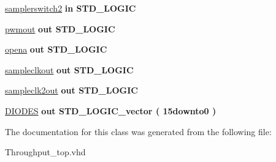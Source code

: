 \begin{DoxyCompactItemize}
\item 
\hypertarget{class_throughput__top_ae2d391f4e16222a601a8dd579da235e1}{\hyperlink{class_throughput__top_ae2d391f4e16222a601a8dd579da235e1}{samplerswitch2}  {\bfseries {\bfseries \textcolor{vhdlkeyword}{in}\textcolor{vhdlchar}{ }}} {\bfseries \textcolor{comment}{S\-T\-D\-\_\-\-L\-O\-G\-I\-C}\textcolor{vhdlchar}{ }} }\label{class_throughput__top_ae2d391f4e16222a601a8dd579da235e1}

\item 
\hypertarget{class_throughput__top_a9d71ac83f1bc0f3c2d3301905417d5de}{\hyperlink{class_throughput__top_a9d71ac83f1bc0f3c2d3301905417d5de}{pwmout}  {\bfseries {\bfseries \textcolor{vhdlkeyword}{out}\textcolor{vhdlchar}{ }}} {\bfseries \textcolor{comment}{S\-T\-D\-\_\-\-L\-O\-G\-I\-C}\textcolor{vhdlchar}{ }} }\label{class_throughput__top_a9d71ac83f1bc0f3c2d3301905417d5de}

\item 
\hypertarget{class_throughput__top_af5250fe1aa0d7b297ddee150fa0d520e}{\hyperlink{class_throughput__top_af5250fe1aa0d7b297ddee150fa0d520e}{opena}  {\bfseries {\bfseries \textcolor{vhdlkeyword}{out}\textcolor{vhdlchar}{ }}} {\bfseries \textcolor{comment}{S\-T\-D\-\_\-\-L\-O\-G\-I\-C}\textcolor{vhdlchar}{ }} }\label{class_throughput__top_af5250fe1aa0d7b297ddee150fa0d520e}

\item 
\hypertarget{class_throughput__top_a4e052b69567763fd6ff754d84667d6d3}{\hyperlink{class_throughput__top_a4e052b69567763fd6ff754d84667d6d3}{sampleclkout}  {\bfseries {\bfseries \textcolor{vhdlkeyword}{out}\textcolor{vhdlchar}{ }}} {\bfseries \textcolor{comment}{S\-T\-D\-\_\-\-L\-O\-G\-I\-C}\textcolor{vhdlchar}{ }} }\label{class_throughput__top_a4e052b69567763fd6ff754d84667d6d3}

\item 
\hypertarget{class_throughput__top_a6866b4d06becbe97f512800ec38ca9c6}{\hyperlink{class_throughput__top_a6866b4d06becbe97f512800ec38ca9c6}{sampleclk2out}  {\bfseries {\bfseries \textcolor{vhdlkeyword}{out}\textcolor{vhdlchar}{ }}} {\bfseries \textcolor{comment}{S\-T\-D\-\_\-\-L\-O\-G\-I\-C}\textcolor{vhdlchar}{ }} }\label{class_throughput__top_a6866b4d06becbe97f512800ec38ca9c6}

\item 
\hypertarget{class_throughput__top_afdc899468fe05511e7456f6fa8091d03}{\hyperlink{class_throughput__top_afdc899468fe05511e7456f6fa8091d03}{D\-I\-O\-D\-E\-S}  {\bfseries {\bfseries \textcolor{vhdlkeyword}{out}\textcolor{vhdlchar}{ }}} {\bfseries \textcolor{comment}{S\-T\-D\-\_\-\-L\-O\-G\-I\-C\-\_\-vector}\textcolor{vhdlchar}{ }\textcolor{vhdlchar}{(}\textcolor{vhdlchar}{ }\textcolor{vhdlchar}{15downto0}\textcolor{vhdlchar}{ }\textcolor{vhdlchar}{)}\textcolor{vhdlchar}{ }} }\label{class_throughput__top_afdc899468fe05511e7456f6fa8091d03}

\end{DoxyCompactItemize}


The documentation for this class was generated from the following file\-:\begin{DoxyCompactItemize}
\item 
Throughput\-\_\-top.\-vhd\end{DoxyCompactItemize}
